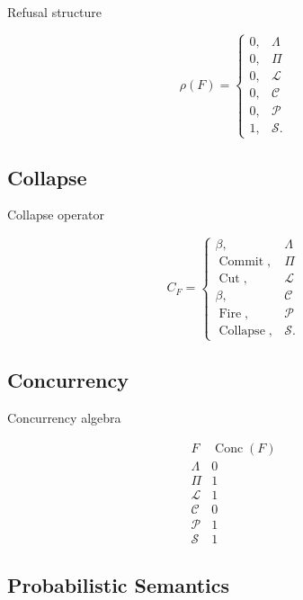 \documentclass[12pt,oneside]{article}
\theoremstyle{definition}
\theoremstyle{remark}
\begin{document}
Refusal structure

\[
\rho(F)
=
\begin{cases}
0,&\Lambda\\
0,&\Pi\\
0,&\mathcal L\\
0,&\mathcal C\\
0,&\mathcal P\\
1,&\mathcal S.
\end{cases}
\]

\subsection*{Collapse}

Collapse operator

\[
C_F
=
\begin{cases}
\beta,&\Lambda\\
\operatorname{Commit},&\Pi\\
\operatorname{Cut},&\mathcal L\\
\beta,&\mathcal C\\
\operatorname{Fire},&\mathcal P\\
\operatorname{Collapse},&\mathcal S.
\end{cases}
\]

\subsection*{Concurrency}

Concurrency algebra

\[
\begin{array}{c|c}
F
&
\operatorname{Conc}(F)
\\
\hline
\Lambda
&
0
\\
\Pi
&
1
\\
\mathcal L
&
1
\\
\mathcal C
&
0
\\
\mathcal P
&
1
\\
\mathcal S
&
1
\end{array}
\]

\subsection*{Probabilistic Semantics}
\end{document}
